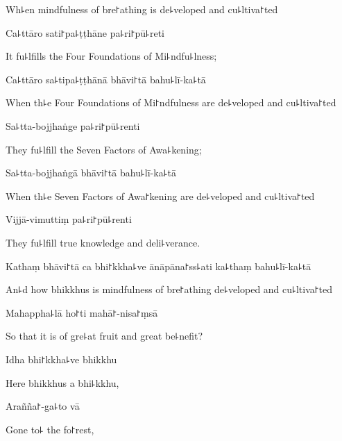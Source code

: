 \begin{english}
  Wh꜕en mindfulness of bre꜓athing is de꜕veloped and cu꜕ltiva꜓ted
\end{english}

Ca꜕ttāro sati꜓pa꜕ṭṭhāne pa꜕ri꜓pū꜕reti

\begin{english}
  It fu꜕lfills the Four Foundations of Mi꜕ndfu꜕lness;
\end{english}

Ca꜕ttāro sa꜕tipa꜕ṭṭhānā bhāvi꜓tā bahu꜕lī-ka꜕tā

\begin{english}
  When th꜕e Four Foundations of Mi꜓ndfulness are de꜕veloped and cu꜕ltiva꜓ted
\end{english}

Sa꜕tta-bojjhaṅge pa꜕ri꜓pū꜕renti

\begin{english}
  They fu꜕lfill the Seven Factors of Awa꜕kening;
\end{english}

Sa꜕tta-bojjhaṅgā bhāvi꜓tā bahu꜕lī-ka꜕tā

\begin{english}
  When th꜕e Seven Factors of Awa꜓kening are de꜕veloped and cu꜕ltiva꜓ted
\end{english}

Vijjā-vimuttiṃ pa꜕ri꜓pū꜕renti

\begin{english}
  They fu꜕lfill true knowledge and deli꜕verance.
\end{english}

Kathaṃ bhāvi꜓tā ca bhi꜓kkha꜕ve ānāpāna꜓ss꜕ati ka꜕thaṃ bahu꜕lī-ka꜕tā

\begin{english}
  An꜕d how bhikkhus is mindfulness of bre꜓athing de꜕veloped and cu꜕ltiva꜓ted
\end{english}

Mahappha꜕lā ho꜓ti mahā꜓-nisa꜓ṃsā

\begin{english}
  So that it is of gre꜕at fruit and great be꜕nefit?
\end{english}

Idha bhi꜓kkha꜕ve bhikkhu

\begin{english}
  Here bhikkhus a bhi꜕kkhu,
\end{english}

Arañña꜓-ga꜕to vā

\begin{english}
  Gone to꜕ the fo꜓rest,
\end{english}

